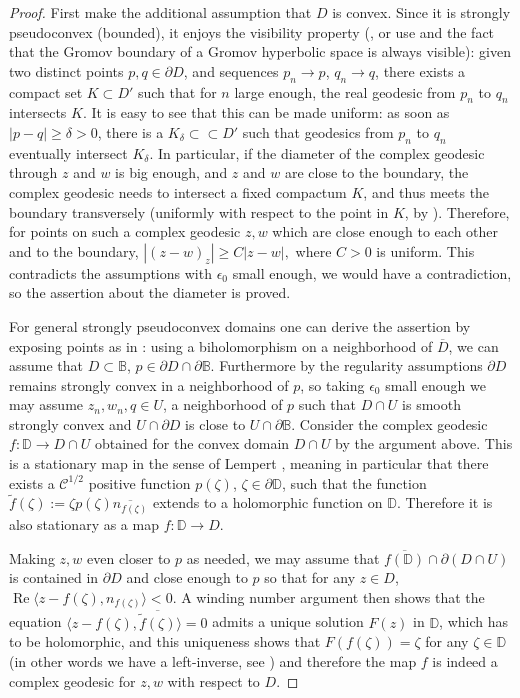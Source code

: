 \documentclass[a4paper,12pt]{amsart}
\newcommand\DD{{\mathbb D}}
\def\re{\operatorname{Re}}
\theoremstyle{remark}\newtheorem{remark}[theorem]{Remark}
\begin{document}
\begin{proof}
First make the additional assumption that $D$ is convex.
Since it is strongly pseudoconvex (bounded), it enjoys the
visibility property (\cite{BZ}, or use \cite{BB} and the fact that
the Gromov boundary of a Gromov hyperbolic space is always visible): given two distinct points $p,q \in \partial D$,
and sequences $p_n\to p$, $q_n\to q$, there exists a compact
set $K\subset D'$ such that for $n$ large enough, the real 
geodesic from $p_n$ to $q_n$ intersects $K$. It is easy to
see that this can be made uniform: as soon as $|p-q|\ge \delta>0$,
there is a $K_\delta \subset \subset D'$ such that geodesics from
$p_n$ to $q_n$ eventually intersect $K_\delta$.
In particular, if the diameter of the 
complex geodesic through $z$ and $w$ is big enough, and $z$ and $w$
are close to the boundary,
the complex geodesic needs to intersect a fixed compactum $K$,
and thus meets the boundary transversely (uniformly with respect to the point in $K$, by \cite[Proposition 14]{L1}). Therefore, for points on such a complex geodesic  $z,w$ which are close enough to each other and to the boundary, $|(z-w)_z|\geq C |z-w|,$ where $C>0$ is uniform.  This contradicts the assumptions with $\epsilon_0$ small enough, we would have a contradiction, so the assertion about the diameter is proved.

For general strongly pseudoconvex domains one can derive the assertion by exposing points as in \cite{DFW}: using a biholomorphism on a neighborhood of $\overline{D}$, 
we can assume that $D\subset \mathbb B$, $p\in \partial D \cap \partial \mathbb B$. Furthermore by the regularity assumptions $\partial D$ remains strongly convex in a neighborhood of $p$, so taking $\epsilon_0$ small enough we may assume $z_n,w_n, q \in U$, a neighborhood of $p$ such that $D\cap U$ is smooth strongly convex and $U\cap \partial D$ is close to $U\cap \partial \mathbb B$.
Consider the complex geodesic $f:\mathbb D\longrightarrow D\cap U$ obtained for the convex domain $D\cap U$ by the  argument above. This is a stationary map in the sense of Lempert \cite[Section 3, p. 562, points 1--3]{L3}, meaning in particular that there exists a $\mathcal C^{1/2}$ positive 
function $p(\zeta)$, $\zeta \in \partial \DD$, such that the function $\tilde f(\zeta):= \zeta p(\zeta) \overline{n_{f(\zeta)}}$ extends to a holomorphic function on $\DD$. Therefore it is also stationary as a map $f:\mathbb D\longrightarrow D$. 

Making $z,w$ even closer to $p$ as needed,  we may assume that $\overline{f(\DD)}\cap \partial (D\cap U)$ is contained in $\partial D$ and close enough to $p$ so that for any $z\in D$, $\re \langle z-f(\zeta), n_{f(\zeta)}\rangle <0$.
A winding number argument then shows that the equation 
$ \langle z-f(\zeta), \overline{\tilde f(\zeta) } \rangle=0$ admits
a unique solution $F(z)$ in $\DD$, which has to be holomorphic, and this uniqueness shows that $F(f(\zeta))=\zeta$ for any $\zeta \in \DD$ (in other words we have a left-inverse, see \cite{KZ}) and 
therefore the map $f$ is indeed a complex geodesic for $z,w$ with respect to $D$.


\end{proof}
\end{document}
